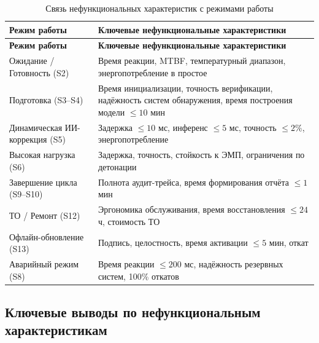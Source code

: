 \documentclass[14pt, a4paper]{extarticle}
\begin{document}
				\begin{xltabular}{\textwidth}{|L|L|}
					\caption{Связь нефункциональных характеристик с режимами работы}\label{tab:nfr-modes}\\
					\hline
					\textbf{Режим работы} & \textbf{Ключевые нефункциональные характеристики} \\
					\hline
					\endfirsthead
					\hline
					\textbf{Режим работы} & \textbf{Ключевые нефункциональные характеристики} \\
					\hline
					\endhead
					\hline
					\endfoot
					\hline
					\endlastfoot
					Ожидание / Готовность (S2) & Время реакции, MTBF, температурный диапазон, энергопотребление в простое \\
					\hline
					Подготовка (S3–S4) & Время инициализации, точность верификации, надёжность систем обнаружения, время построения модели \(\leq 10\) мин \\
					\hline
					Динамическая ИИ-коррекция (S5) & Задержка \(\leq 10\) мс, инференс \(\leq 5\) мс, точность \(\leq 2\%\), энергопотребление \\
					\hline
					Высокая нагрузка (S6) & Задержка, точность, стойкость к ЭМП, ограничения по детонации \\
					\hline
					Завершение цикла (S9–S10) & Полнота аудит-трейса, время формирования отчёта \(\leq 1\) мин \\
					\hline
					ТО / Ремонт (S12) & Эргономика обслуживания, время восстановления \(\leq 24\) ч, стоимость ТО \\
					\hline
					Офлайн-обновление (S13) & Подпись, целостность, время активации \(\leq 5\) мин, откат \\
					\hline
					Аварийный режим (S8) & Время реакции \(\leq 200\) мс, надёжность резервных систем, 100\% откатов \\
					\hline
				\end{xltabular}
				
				\subsection{Ключевые выводы по нефункциональным характеристикам}
				
\end{document}
